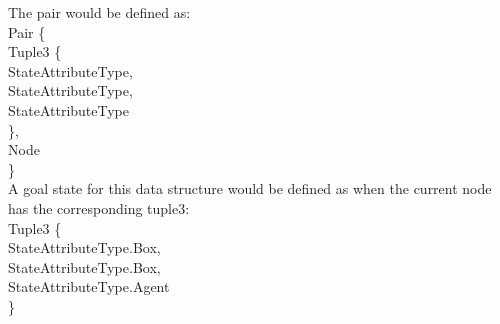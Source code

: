 \begin{enumerate}
\begin{enumerate}
\begin{enumerate}
						The pair would be defined as: \\
						
						Pair \{ \\
							\hspace*{4mm} Tuple3 \{ \\
							\hspace*{4mm} \hspace*{4mm} StateAttributeType, \\
							\hspace*{4mm} \hspace*{4mm} StateAttributeType, \\
							\hspace*{4mm} \hspace*{4mm} StateAttributeType \\
							\hspace*{4mm} \}, \\
							\hspace*{4mm} Node \\
						\} \\
						
						A goal state for this data structure would be defined as when the current node has the corresponding tuple3: \\
					
						Tuple3 \{ \\
						\hspace*{4mm} StateAttributeType.Box, \\
						\hspace*{4mm} StateAttributeType.Box, \\
						\hspace*{4mm} StateAttributeType.Agent \\
						\} \\
						

\end{enumerate}
\end{enumerate}
\end{enumerate}
